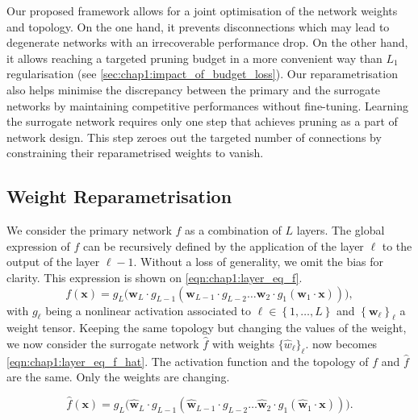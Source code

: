 Our proposed framework allows for a joint optimisation of the network weights
and topology. On the one hand, it prevents disconnections which may lead to
degenerate networks with an irrecoverable performance drop. On the other hand,
it allows reaching a targeted pruning budget in a more convenient way than $L_1$
regularisation (see \cref{sec:chap1:impact_of_budget_loss}). Our
reparametrisation also helps minimise the discrepancy between the primary and
the surrogate networks by maintaining competitive performances without
fine-tuning. Learning the surrogate network requires only one step that achieves
pruning as a part of network design. This step zeroes out the targeted number of
connections by constraining their reparametrised weights to vanish.


\subsection{Weight Reparametrisation}
\label{sec:chap1:weight_reparam}

We consider the primary network $f$ as a combination of $L$ layers. The global
expression of $f$ can be recursively defined by the application of the layer $\ell$
to the output of the layer $\ell-1$. Without a loss of generality, we omit the
bias for clarity. This expression is shown on
\cref{eqn:chap1:layer_eq_f}.
\begin{equation}
\label{eqn:chap1:layer_eq_f}
f(\mathbf{x}) = g_L \big(\mathbf{w}_L \cdot g_{L-1}(\mathbf{w}_{L-1} \cdot g_{L-2} \dots
\mathbf{w}_2 \cdot g_1(\mathbf{w}_1 \cdot \mathbf{x}))\big),
\end{equation}
\noindent with $g_\ell$ being a nonlinear activation associated to $\ell \in
\left\{ 1,\dots, L \right\}$ and $\left\{ \mathbf{w}_\ell \right\}_\ell$ a
weight tensor. Keeping the same topology but changing the values of the weight,
we now consider the surrogate network $\hat{f}$ with weights
$\{\hat{w}_\ell\}_\ell$.  now becomes
\cref{eqn:chap1:layer_eq_f_hat}. The activation function and the topology of $f$
and $\hat{f}$ are the same. Only the weights are changing.

\begin{equation}
\label{eqn:chap1:layer_eq_f_hat}
\hat{f}(\mathbf{x}) = g_L \big(\mathbf{\hat w}_L \cdot g_{L-1}(\mathbf{\hat w}_{L-1} \cdot g_{L-2}
\dots\mathbf{\hat w}_2 \cdot g_1(\mathbf{\hat w}_1 \cdot \mathbf{x}))\big).
\end{equation}


